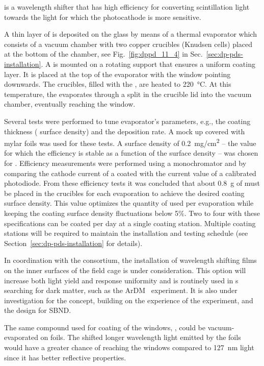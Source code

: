  is a wavelength shifter that has high efficiency for converting \lar scintillation  light towards the light for which the  photocathode is more sensitive. 

A thin layer of  is deposited on the  glass by means of a thermal evaporator which consists of a vacuum chamber with two copper crucibles (Knudsen cells) placed at the bottom of the chamber, see Fig.~\ref{fig:dppd_11_4} in Sec.~\ref{sec:dp-pds-installation}. A  is mounted on a rotating support that ensures a uniform coating layer. It is placed at the top of the evaporator with the   window pointing downwards. The crucibles, filled with the , are heated to \SI{220}{\degreeCelsius}. At this temperature, the  evaporates through a split in the crucible lid into the vacuum chamber, eventually reaching the  window.

Several tests were performed to tune evaporator's parameters, e.g., the coating thickness ( surface density) and the deposition rate. A  mock up covered with mylar foils was used for these tests. A  surface density of \SI{0.2}{mg/cm^2} -- the value for which the  efficiency is stable as a function of the surface density -- was chosen for . Efficiency measurements were performed using a  monochromator and by comparing the cathode current of a coated  with the current value of a calibrated photodiode. From these efficiency tests it was concluded that about \SI{0.8}{g} of  must be placed in the crucibles for each evaporation to achieve the desired  coating surface density. %
This value optimizes the quantity of  used per evaporation while keeping the coating surface density fluctuations below \num{5}$\%$.  
Two to four   with these specifications can be coated per day at a single coating station. 
Multiple coating stations will be required to maintain the installation and testing schedule (see Section~\ref{sec:dp-pds-installation} for details).

In coordination with the  consortium, the installation of wavelength shifting films on the inner surfaces of the field cage is under consideration. This option will increase both light yield and response uniformity and is routinely used in \dual \lartpc{}s searching for dark matter, such as the ArDM~\cite{Boccone:2009zz} experiment. It is also under investigation for the  concept, building on the experience of the \lariat experiment, and the design for SBND. 

 The same  compound used for coating of the  windows, , could be vacuum-evaporated on foils. The shifted longer wavelength light emitted by the foils would have a greater chance of reaching the  windows compared to \SI{127}{nm} light since it has better reflective properties. 
